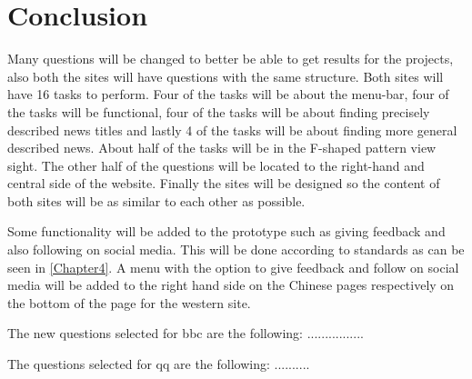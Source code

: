 \section{Conclusion}
Many questions will be changed to better be able to get results for the projects, also both the sites will have questions with the same structure. Both sites will have 16 tasks to perform. Four of the tasks will be about the menu-bar, four of the tasks will be functional, four of the tasks will be about finding precisely described news titles and lastly 4 of the tasks will be about finding more general described news. About half of the tasks will be in the F-shaped pattern view sight. The other half of the questions will be located to the right-hand and central side of the website. Finally the sites will be designed so the content of both sites will be as similar to each other as possible. 

Some functionality will be added to the prototype such as giving feedback and also following on social media. This will be done according to standards as can be seen in \ref{Chapter4}. A menu with the option to give feedback and follow on social media will be added to the right hand side on the Chinese pages respectively on the bottom of the page for the western site.

The new questions selected for bbc are the following:
................

The questions selected for qq are the following:
..........

